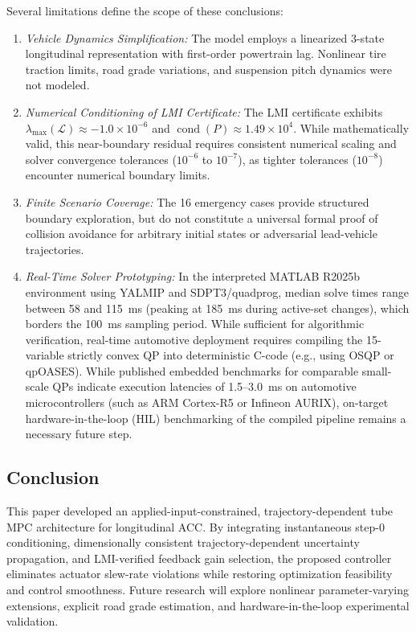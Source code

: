 \documentclass[journal]{IEEEtran}
\begin{document}
Several limitations define the scope of these conclusions:
\begin{enumerate}
    \item \emph{Vehicle Dynamics Simplification:} The model employs a linearized 3-state longitudinal representation with first-order powertrain lag. Nonlinear tire traction limits, road grade variations, and suspension pitch dynamics were not modeled.
    \item \emph{Numerical Conditioning of LMI Certificate:} The LMI certificate exhibits $\lambda_{\max}(\mathcal{L}) \approx -1.0\times 10^{-6}$ and $\operatorname{cond}(P) \approx 1.49\times 10^4$. While mathematically valid, this near-boundary residual requires consistent numerical scaling and solver convergence tolerances ($10^{-6}$ to $10^{-7}$), as tighter tolerances ($10^{-8}$) encounter numerical boundary limits.
    \item \emph{Finite Scenario Coverage:} The 16 emergency cases provide structured boundary exploration, but do not constitute a universal formal proof of collision avoidance for arbitrary initial states or adversarial lead-vehicle trajectories.
    \item \emph{Real-Time Solver Prototyping:} In the interpreted MATLAB R2025b environment using YALMIP and SDPT3/quadprog, median solve times range between 58 and 115~ms (peaking at 185~ms during active-set changes), which borders the 100~ms sampling period. While sufficient for algorithmic verification, real-time automotive deployment requires compiling the 15-variable strictly convex QP into deterministic C-code (e.g., using OSQP or qpOASES). While published embedded benchmarks for comparable small-scale QPs indicate execution latencies of 1.5--3.0~ms on automotive microcontrollers (such as ARM Cortex-R5 or Infineon AURIX), on-target hardware-in-the-loop (HIL) benchmarking of the compiled pipeline remains a necessary future step.
\end{enumerate}

\subsection{Conclusion}

This paper developed an applied-input-constrained, trajectory-dependent tube MPC architecture for longitudinal ACC. By integrating instantaneous step-0 conditioning, dimensionally consistent trajectory-dependent uncertainty propagation, and LMI-verified feedback gain selection, the proposed controller eliminates actuator slew-rate violations while restoring optimization feasibility and control smoothness. Future research will explore nonlinear parameter-varying extensions, explicit road grade estimation, and hardware-in-the-loop experimental validation.
\end{document}
